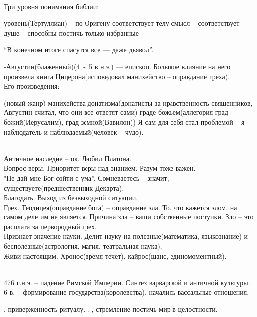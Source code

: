 \documentclass[a4paper,12pt]{report} %
\begin{document}
\begin{itemize}
\begin{enumerate}
\begin{enumerate}
      \\Три уровня понимания библии:
      \begin{itemize}
       уровень(Тертуллиан) -- по Оригену соответствует телу
       смысл -- соответствует душе
       -- способны постичь только избранные
      \end{itemize}
      ``В конечном итоге спасутся все --- даже дьявол''.
    \end{enumerate}
  -Августин(блаженный)(4~-~5 в н.э.) --- епископ. Большое влияние на
    него произвела книга Цицерона(исповедовал манихейство -- оправдание
    греха).
    \\Его произведения:
    \begin{enumerate}
    (новый жанр)
     манихейства
     донатизма(донатисты за нравственность священников,
      Августин считал, что они все ответят сами)
     граде божьем(аллегория град божий(Иерусалим), град
      земной(Вавилон)) Я сам для себя стал проблемой -- я наблюдатель и
      наблюдаемый(человек -- чудо).
    \end{enumerate}
    \\Античное наследие -- ок. Любил Платона.
    \\Вопрос веры. Приоритет веры над знанием. Разум тоже важен.
    \\"Не дай мне Бог сойти с ума''. Сомневаетесь -- значит,
    существуете(предшественник Декарта).
    \\Благодать. Выход из безвыходной ситуации.
    \\Грех. Теодицея(оправдание бога) -- оправдание зла. То, что кажется
    злом, на самом деле им не является. Причина зла -- ваши собственные
    поступки. Зло -- это расплата за первородный грех.
    \\Признает значение науки. Делит науку на полезные(математика, языкознание) и
    бесполезные(астрология, магия, театральная наука).
    \\Живи настоящим. Хронос(время течет), кайрос(шанс, единомоментный).
  \end{enumerate}
  \\476 г.н.э. -- падение Римской Империи. Синтез варварской и античной
  культуры. 6 в. -- формирование государства(королевства), начались
  вассальные отношения. 
  \begin{itemize}
  , приверженность
    ритуалу. 
  . 
  , стремление постичь мир в
    целостности. 

\end{itemize}
\end{itemize}
\end{document}
